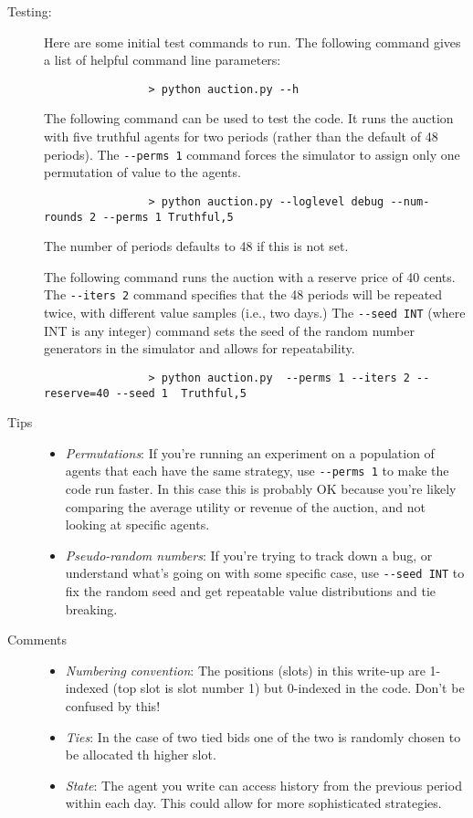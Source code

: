 \documentclass[11pt]{article}
\begin{document}
\begin{description}
		\item[Testing:] Here are some initial test commands to run. The following command gives a list of helpful command line parameters:
			\begin{verbatim}
				> python auction.py --h
			\end{verbatim}

			The following command can be used to test the code. It runs the auction with five truthful agents for two periods (rather than the default of 48 periods). The \verb+--perms 1+ command forces the simulator to assign only one permutation of value to the agents. %
			\begin{verbatim}
				> python auction.py --loglevel debug --num-rounds 2 --perms 1 Truthful,5
			\end{verbatim}

The number of periods defaults to 48 if this is not set.

The following command runs the auction with a reserve price of 40
cents. The \verb+--iters 2+ command specifies that the 48 periods will
be repeated twice, with different value samples (i.e., two days.)
%
The
%
\verb+--seed INT+ (where INT is any integer) command
 sets the seed of the random number generators in the simulator and
allows for repeatability.
%
			\begin{verbatim}
				> python auction.py  --perms 1 --iters 2 --reserve=40 --seed 1  Truthful,5
			\end{verbatim}


		\item[Tips]
			\begin{itemize}
				\item {\em Permutations}: If you're
running an experiment on a population of agents that each have the
same strategy,
use \verb+--perms 1+ to make the code run faster. In this case this is
probably OK because you're likely comparing the average utility or
revenue of the auction, and not looking at specific agents.
%
				\item {\em Pseudo-random numbers}: If you're trying to track down a bug, or understand what's going on with some specific case, use \verb+--seed INT+ to fix the random seed and get repeatable value distributions and tie breaking.
			\end{itemize}

\item[Comments]
\begin{itemize}
\item {\em Numbering convention}: The positions (slots) in this
  write-up are 1-indexed (top slot is slot number 1) but 0-indexed in
  the code. Don't be confused by this!
%
\item {\em Ties}: In the case of two tied bids one of the two is randomly chosen to be allocated th higher slot.
%
\item
{\em State}: The agent you write can access history from the previous period within each day. 
This could allow for more sophisticated strategies.


\end{itemize}
\end{description}
\end{document}

